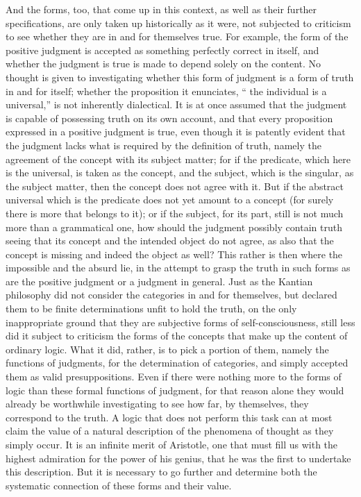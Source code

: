 And the forms, too, that come up in this context,
 as well
as their further specifications,
 are only taken up historically as it were,
  not
subjected to criticism to see whether they are in and for themselves true.
For example, the form of the positive judgment is accepted as something
perfectly correct in itself,
and whether the judgment is true is made to
depend solely on the content.
 No thought is given to investigating whether
this form of judgment is a form of truth in and for itself;
whether the
proposition it enunciates, “
the individual is a universal,” is not inherently
dialectical.
It is at once assumed that the judgment is capable of possessing
truth on its own account,
 and that every proposition expressed in a positive
judgment is true, even though it is patently evident that the judgment lacks
what is required by the definition of truth, namely the agreement of the
concept with its subject matter; for if the predicate, which here is the
universal, is taken as the concept,
and the subject, which is the singular,
as the subject matter,
then the concept does not agree with it.
 But if the
abstract universal which is the predicate does not yet amount to a concept
(for surely there is more that belongs to it);
or if the subject, for its part,
still is not much more than a grammatical one, how should the judgment
possibly contain truth seeing that its concept and the intended object do
not agree, as also that the concept is missing and indeed the object as well?
This rather is then where the impossible and the absurd lie, in the attempt
to grasp the truth in such forms as are the positive judgment or a judgment
in general.
Just as the Kantian philosophy did not consider
the categories in and for themselves,
but declared them to be finite determinations
unfit to hold the truth,
on the only inappropriate ground that
they are subjective forms of self-consciousness,
still less did it subject to criticism the forms
of the concepts that make up the content of ordinary logic.
What it did, rather, is to pick a portion of them,
namely the functions of judgments,
for the determination of categories,
and simply accepted them as valid presuppositions.
Even if there were nothing more to the forms of logic
than these formal functions of judgment,
for that reason alone they would already be
worthwhile investigating to see how far, by themselves,
they correspond to the truth.
A logic that does not perform this task can at most claim
the value of a natural description of the phenomena of thought
as they simply occur.
It is an infinite merit of Aristotle,
one that must fill us with the highest admiration
for the power of his genius,
that he was the first to undertake this description.
But it is necessary to go further
and determine both the systematic connection
of these forms and their value.

